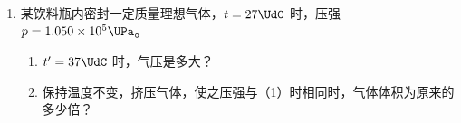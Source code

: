 \documentclass[\gkver]{gaokaozhenti}
\begin{document}
\begin{enumerate}
{	（2）根据电路图连接实物图有


	（3）根据半偏法的实验步骤应为

	① 将变阻器滑动头 P 移至最左端，将 $R_{N}$ 调至最大值；

	③ 断开 $S_{2}$，闭合 $S_{1}$，调节滑动头 P 至某位置再调节 $R_{N}$ 使表头满偏；

	② 闭合开关 $S_{2}$，调节 $R_{M}$，使微安表半偏，并读出 $R_{M}$ 阻值；

	④ 断开 $S_{1}$、$S_{2}$，拆除导线，整理好器材。

	（4）根据 $R_{M}$ 调节后面板读数为 $1\,998.0 \UO$。

	当闭合 $S_{2}$ 后，原电路可看成如下电路


	闭合 $S_{2}$ 后，相当于 $R_{M}$ 由无穷大变成有限值，变小了，则流过 $R_{N}$ 的电流大于原来的电流，则流过 $R_{M}$ 的电流大于 $\frac{I_{\text{原}}}{2}$，故待测表头的内阻的测量值小于真实值。

	（5）将该微安表改装成量程为 $2 \UV$ 的电压表，则需要串联一个电阻 $R_{0}$，则有

	$U = I_{g}(R_{g} + R_{0})$

	此时的电压读数有 $U' = I'(R_{g} + R_{0})$

	其中 $U = 2 \UV$，$I_{g} = 100 \UuA$，$I' = 64 \UuA$

	联立解得 $U' = 1.28 \UV$

	（6）根据题意 OP 间电压不变，可得

	$I(R_{A} + R_{N}) = \left(\frac{I}{2} + \frac{\frac{I}{2}R_{A}}{R_{M}}\right)R_{N} + \frac{I}{2}R_{A}$

	解得 $R_{A} = \frac{R_{N}R_{M}}{R_{N} - R_{M}}$
}

\item
某饮料瓶内密封一定质量理想气体，$t = 27\UdC$ 时，压强 $p = 1.050 \times 10^{5} \UPa$。
\begin{enumerate}
	\item
	$t' = 37\UdC$ 时，气压是多大？
	\item
	保持温度不变，挤压气体，使之压强与（1）时相同时，气体体积为原来的多少倍？
\end{enumerate}
\end{enumerate}
\end{document}
